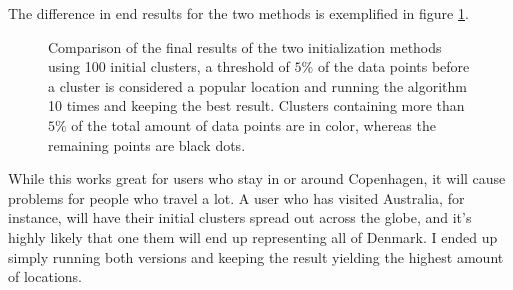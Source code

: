 The difference in end results for the two methods is exemplified in figure \ref{fig:lloyds_result_comparison}.
\begin{figure} %
	\centering
	\caption{Comparison of the final results of the two initialization methods using 100 initial clusters, a threshold of $5\%$ of the data points before a cluster is considered a popular location and running the algorithm 10 times and keeping the best result. Clusters containing more than $5\%$ of the total amount of data points are in color, whereas the remaining points are black dots.}
	\label{fig:lloyds_result_comparison}
\end{figure}
While this works great for users who stay in or around Copenhagen, it will cause problems for people who travel a lot. A user who has visited Australia, for instance, will have their initial clusters spread out across the globe, and it's highly likely that one them will end up representing all of Denmark. I ended up simply running both versions and keeping the result yielding the highest amount of locations.

